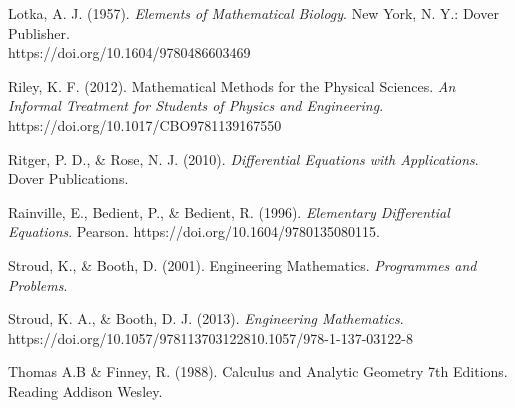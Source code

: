 \documentclass[11pt]{report}
\begin{document}
\begin{description}
		\item Lotka, A. J. (1957). \emph{Elements of Mathematical Biology}. New York, N. Y.: Dover Publisher. \\
		https://doi.org/10.1604/9780486603469
		
		\item Riley, K. F. (2012). Mathematical Methods for the Physical Sciences. \emph{An Informal Treatment for Students of Physics and Engineering}.\\ https://doi.org/10.1017/CBO9781139167550
		
		\item Ritger, P. D., \& Rose, N. J. (2010). \emph{Differential Equations with Applications}. Dover Publications.
		
		\item Rainville, E., Bedient, P., \& Bedient, R. (1996). \emph{Elementary Differential Equations}. Pearson. https://doi.org/10.1604/9780135080115.
		
		\item Stroud, K., \& Booth, D. (2001). Engineering Mathematics. \emph{Programmes and Problems}.
		
		\item Stroud, K. A., \& Booth, D. J. (2013). \emph{Engineering Mathematics}.\\ https://doi.org/10.1057/978113703122810.1057/978-1-137-03122-8
		
		\item Thomas A.B \& Finney, R. (1988). Calculus and Analytic Geometry 7th Editions. Reading Addison Wesley.
	\end{description}
	
\end{document}
